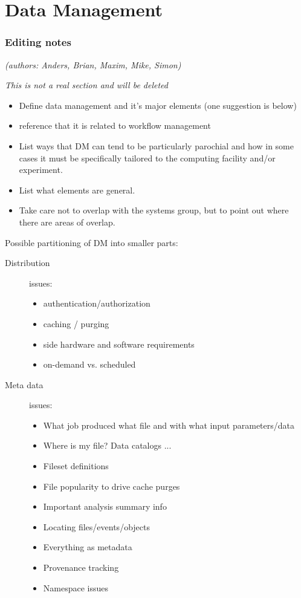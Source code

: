 \section{Data Management}
\label{data}
\subsubsection{Editing notes}

\textit{(authors: Anders, Brian, Maxim, Mike, Simon)}

\textit{This is not a real section and will be deleted}

\begin{itemize}
\item Define data management and it's major elements (one suggestion is below)
\item reference that it is related to workflow management
\item List ways that DM can tend to be particularly parochial and how in some cases it must be specifically tailored to the computing facility and/or experiment.
\item List what elements are general.
\item Take care not to overlap with the systems group, but to point out where there are areas of overlap.
\end{itemize}
Possible partitioning of DM into smaller parts:
\begin{description}
\item[Distribution] issues:
  \begin{itemize}
  \item authentication/authorization
  \item caching / purging
  \item side hardware and software requirements
  \item on-demand vs. scheduled
  \end{itemize}
\item[Meta data] issues:
  \begin{itemize}
  \item What job produced what file and with what input parameters/data
  \item Where is my file? Data catalogs ...
  \item Fileset definitions
  \item File popularity to drive cache purges
  \item Important analysis summary info
  \item Locating files/events/objects
  \item Everything as metadata
  \item Provenance tracking
  \item Namespace issues
  \end{itemize}
\end{description}



